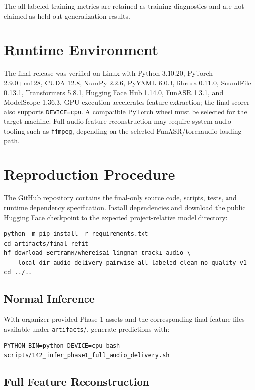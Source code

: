 \documentclass[11pt]{article}
\begin{document}
The all-labeled training metrics are retained as training diagnostics and are
not claimed as held-out generalization results.

\section{Runtime Environment}

The final release was verified on Linux with Python 3.10.20, PyTorch
2.9.0+cu128, CUDA 12.8, NumPy 2.2.6, PyYAML 6.0.3, librosa 0.11.0, SoundFile
0.13.1, Transformers 5.8.1, Hugging Face Hub 1.14.0, FunASR 1.3.1, and
ModelScope 1.36.3. GPU execution accelerates feature extraction; the final
scorer also supports \texttt{DEVICE=cpu}. A compatible PyTorch wheel must be
selected for the target machine. Full audio-feature reconstruction may require
system audio tooling such as \texttt{ffmpeg}, depending on the selected
FunASR/torchaudio loading path.

\section{Reproduction Procedure}

The GitHub repository contains the final-only source code, scripts, tests, and
runtime dependency specification. Install dependencies and download the public
Hugging Face checkpoint to the expected project-relative model directory:

\begin{verbatim}
python -m pip install -r requirements.txt
cd artifacts/final_refit
hf download BertramM/whereisai-lingnan-track1-audio \
  --local-dir audio_delivery_pairwise_all_labeled_clean_no_quality_v1
cd ../..
\end{verbatim}

\subsection{Normal Inference}

With organizer-provided Phase 1 assets and the corresponding final feature files
available under \texttt{artifacts/}, generate predictions with:

\begin{verbatim}
PYTHON_BIN=python DEVICE=cpu bash scripts/142_infer_phase1_full_audio_delivery.sh
\end{verbatim}

\subsection{Full Feature Reconstruction}
\end{document}

